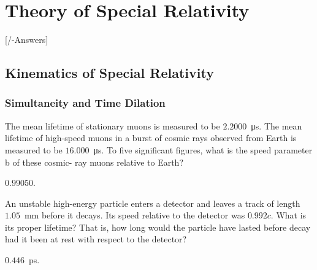 
\chapter{Theory of Special Relativity}\label{\currfilebase}
[\currfilebase/\currfilebase-Answers]
%

\section{Kinematics of Special Relativity}

\subsection{Simultaneity and Time Dilation}

\begin{problem}
	The mean lifetime of stationary muons is measured to be $2.2000$~\si{\micro\second}. The mean lifetime of high-speed muons in a burst of cosmic rays observed from Earth is measured to be $16.000$~\si{\micro\second}. To five significant figures, what is the speed parameter b of these cosmic- ray muons relative to Earth?
	\begin{solution}
		$0.990 50$.
	\end{solution}
\end{problem}

\begin{problem}
	An unstable high-energy particle enters a detector and leaves a track of length $1.05$~mm before it decays. Its speed relative to the detector was $0.992c$. What is its proper lifetime? That is, how long would the particle have lasted before decay had it been at rest with respect to the detector?
	\begin{solution}
		$0.446$~\si{\pico\second}.
	\end{solution}
\end{problem}

